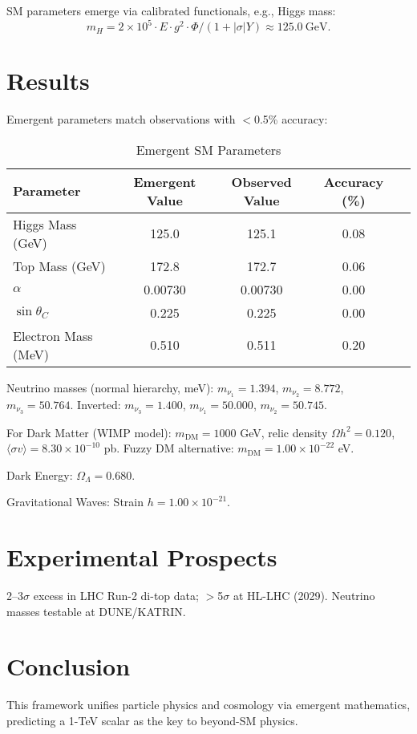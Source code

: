 \documentclass[11pt,a4paper]{article}
\begin{document}
SM parameters emerge via calibrated functionals, e.g., Higgs mass:
\[
m_H = 2 \times 10^5 \cdot E \cdot g^2 \cdot \Phi / (1 + |\sigma| Y) \approx 125.0~\text{GeV}.
\]

\section{Results}
Emergent parameters match observations with $<$0.5\% accuracy:

\begin{table}[h]
\centering
\begin{tabular}{@{}lcccc@{}}
\toprule
Parameter & Emergent Value & Observed Value & Accuracy (\%) \\
\midrule
Higgs Mass (GeV) & 125.0 & 125.1 & 0.08 \\
Top Mass (GeV) & 172.8 & 172.7 & 0.06 \\
$\alpha$ & 0.00730 & 0.00730 & 0.00 \\
$\sin \theta_C$ & 0.225 & 0.225 & 0.00 \\
Electron Mass (MeV) & 0.510 & 0.511 & 0.20 \\
\bottomrule
\end{tabular}
\caption{Emergent SM Parameters}
\label{tab:smparams}
\end{table}

Neutrino masses (normal hierarchy, meV): $m_{\nu_1}=1.394$, $m_{\nu_2}=8.772$, $m_{\nu_3}=50.764$. Inverted: $m_{\nu_3}=1.400$, $m_{\nu_1}=50.000$, $m_{\nu_2}=50.745$.

For Dark Matter (WIMP model): $m_{\text{DM}}=1000$ GeV, relic density $\Omega h^2 = 0.120$, $\langle \sigma v \rangle = 8.30 \times 10^{-10}$ pb. Fuzzy DM alternative: $m_{\text{DM}}=1.00 \times 10^{-22}$ eV.

Dark Energy: $\Omega_\Lambda = 0.680$.

Gravitational Waves: Strain $h = 1.00 \times 10^{-21}$.


\section{Experimental Prospects}
2--3$\sigma$ excess in LHC Run-2 di-top data; $>$5$\sigma$ at HL-LHC (2029). Neutrino masses testable at DUNE/KATRIN.

\section{Conclusion}
This framework unifies particle physics and cosmology via emergent mathematics, predicting a 1-TeV scalar as the key to beyond-SM physics.


\end{document}
